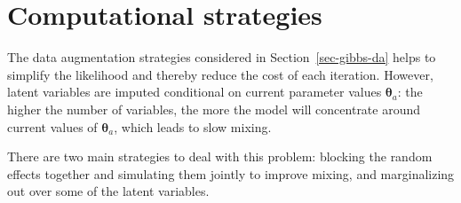 \documentclass[
  11pt,
  letterpaper,
]{scrbook}
\theoremstyle{plain}
\theoremstyle{plain}
\theoremstyle{definition}
\theoremstyle{definition}
\theoremstyle{definition}
\theoremstyle{plain}
\theoremstyle{remark}
\begin{document}
\section{Computational strategies}\label{computational-strategies}

The data augmentation strategies considered in
Section~\ref{sec-gibbs-da} helps to simplify the likelihood and thereby
reduce the cost of each iteration. However, latent variables are imputed
conditional on current parameter values \(\boldsymbol{\theta}_a\): the
higher the number of variables, the more the model will concentrate
around current values of \(\boldsymbol{\theta}_a\), which leads to slow
mixing.

There are two main strategies to deal with this problem: blocking the
random effects together and simulating them jointly to improve mixing,
and marginalizing out over some of the latent variables.
\end{document}

